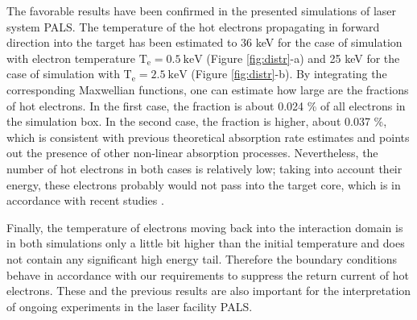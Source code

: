 The favorable results have been confirmed in the presented simulations of laser system PALS. The temperature of the hot electrons propagating in forward direction into the target has been estimated to 36 keV for the case of simulation with electron temperature $ \mathrm{T_e} = 0.5 \: \mathrm{keV} $ (Figure \ref{fig:distr}-a) and 25 keV for the case of simulation with $ \mathrm{T_e} = 2.5 \: \mathrm{keV} $ (Figure \ref{fig:distr}-b). By integrating the corresponding Maxwellian functions, one can estimate how large are the fractions of hot electrons. In the first case, the fraction is about 0.024 \% of all electrons in the simulation box. In the second case, the fraction is higher, about 0.037 \%, which is consistent with previous theoretical absorption rate estimates and points out the presence of other non-linear absorption processes. Nevertheless, the number of hot electrons in both cases is relatively low; taking into account their energy, these electrons probably would not pass into the target core, which is in accordance with recent studies \cite{tikhonchuk}. 

Finally, the temperature of electrons moving back into the interaction domain is in both simulations only a little bit higher than the initial temperature and does not contain any significant high energy tail. Therefore the boundary conditions behave in accordance with our requirements to suppress the return current of hot electrons. These and the previous results are also important for the interpretation of ongoing experiments in the laser facility PALS.